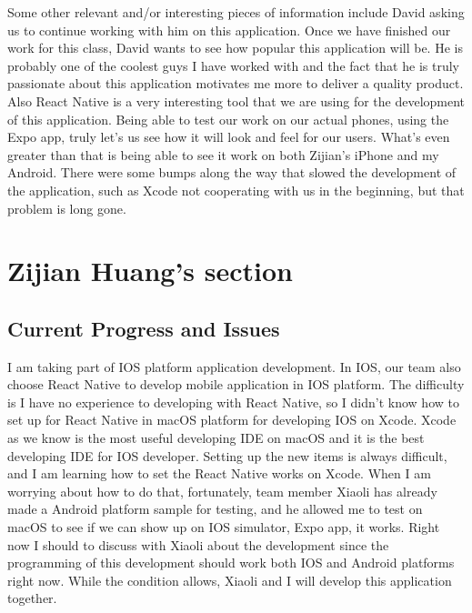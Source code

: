 \documentclass[letterpaper, 10pt,titlepage]{article}
\begin{document}
Some other relevant and/or interesting pieces of information include David asking us to continue working with him on this application. Once we have finished our work for this class, David wants to see how popular this application will be. He is probably one of the coolest guys I have worked with and the fact that he is truly passionate about this application motivates me more to deliver a quality product. Also React Native is a very interesting tool that we are using for the development of this application. Being able to test our work on our actual phones, using the Expo app, truly let’s us see how it will look and feel for our users. What’s even greater than that is being able to see it work on both Zijian’s iPhone and my Android. There were some bumps along the way that slowed the development of the application, such as Xcode not cooperating with us in the beginning, but that problem is long gone.

\section{Zijian Huang's section}
\subsection{Current Progress and Issues}
I am taking part of IOS platform application development. In IOS, our team also choose React Native to develop mobile application in IOS platform. The difficulty is I have no experience to developing with React Native, so I didn't know how to set up for React Native in macOS platform for developing IOS on Xcode. Xcode as we know is the most useful developing IDE on macOS and it is the best developing IDE for IOS developer. Setting up the new items is always difficult, and I am learning how to set the React Native works on Xcode. When I am worrying about how to do that, fortunately, team member Xiaoli has already made a Android platform sample for testing, and he allowed me to test on macOS to see if we can show up on IOS simulator, Expo app, it works. Right now I should to discuss with Xiaoli about the development since the programming of this development should work both IOS and Android platforms right now. While the condition allows, Xiaoli and I will develop this application together.
\end{document}
